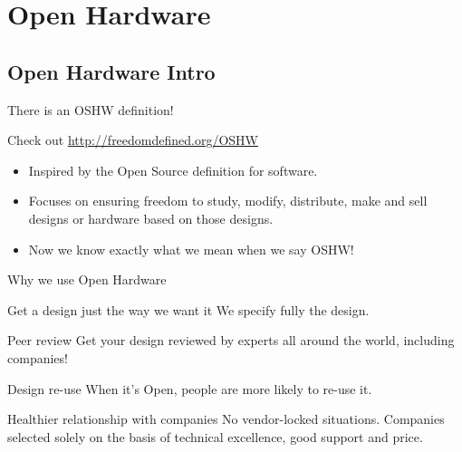 \documentclass[compress,red]{beamer}
\begin{document}

\section{Open Hardware}


\subsection{Open Hardware Intro}

\begin{frame}{There is an OSHW definition!}

\begin{block}{Check out \href{http://freedomdefined.org/OSHW}{http://freedomdefined.org/OSHW}}
\begin{itemize}
 \item Inspired by the Open Source definition for software.
 \item Focuses on ensuring freedom to study, modify, distribute, make
   and sell designs or hardware based on those designs.
 \item Now we know exactly what we mean when we say OSHW!
\end{itemize}
\end{block}
\end{frame}

\begin{frame}{Why we use Open Hardware}

	\begin{block}{Get a design just the way we want it}
We specify fully the design.
	\end{block}	

	\begin{block}{Peer review}
	 Get your design reviewed by experts all around the world, including companies!
	\end{block}

\begin{block}{Design re-use}
  When it's Open, people are more likely to re-use it.
	\end{block}
	\begin{block}{Healthier relationship with companies}
          No vendor-locked situations. Companies selected solely on the basis of technical excellence, good support and price.
	\end{block}
\end{frame}
\end{document}
